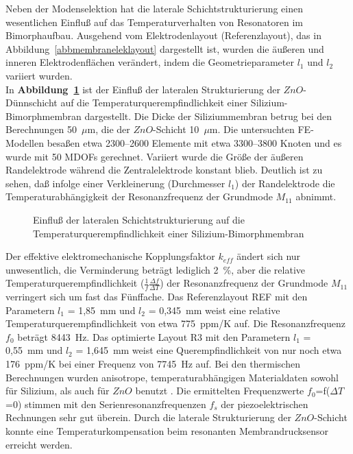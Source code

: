 Neben der Modenselektion hat die laterale Schichtstrukturierung einen
wesentlichen Einfluß auf das Temperaturverhalten von Resonatoren im
Bimorphaufbau. Ausgehend vom Elektrodenlayout (Referenzlayout), das in
Abbildung~\ref{abbmembraneleklayout} dargestellt ist, wurden die äußeren
und inneren Elektrodenflächen verändert, indem die Geometrieparameter
$l_{1}$ und $l_{2}$ variiert wurden. \\
%
%
In {\bf Abbildung~\ref{abbtempabhfreq}} ist der Einfluß der lateralen
Strukturierung der $ZnO$-Dünnschicht auf die Temperaturquerempfindlichkeit
einer Silizium-Bimorphmembran dargestellt. Die Dicke der Siliziummembran
betrug bei den Berechnungen 50~$\mu$m, die der $ZnO$-Schicht 10~$\mu$m.
Die untersuchten FE-Modellen besaßen etwa 2300--2600 Elemente mit etwa
3300--3800 Knoten und es wurde mit 50 MDOFs gerechnet.
Variiert wurde die Größe der äußeren Randelektrode während die
Zentralelektrode konstant blieb. Deutlich ist zu sehen, daß infolge
einer Verkleinerung (Durchmesser $l_{1}$) der Randelektrode die
Temperaturabhängigkeit der Resonanzfrequenz der Grundmode $M_{11}$ abnimmt.
\begin{figure}[htb]

\begin{center}

\setabbfelf
\end{center}
\caption{\label{abbtempabhfreq}
 Einfluß der lateralen Schichtstrukturierung auf die
 Temperaturquerempfindlichkeit einer Silizium-Bimorphmembran }
\end{figure}
Der effektive elektromechanische Kopplungsfaktor $k_{eff}$ ändert sich nur
unwesentlich, die Verminderung beträgt lediglich 2~\%, aber die relative
Temperaturquerempfindlichkeit ($\frac{1}{f}\frac{\Delta f}{\Delta T}$)
der Resonanzfrequenz der Grundmode $M_{11}$ verringert sich um fast das
Fünffache. Das Referenzlayout REF mit den Parametern $l_{1}$ = 1,85~mm
und $l_{2}$ = 0,345~mm weist eine relative Temperaturquerempfindlichkeit
von etwa 775~ppm/K auf. Die Resonanzfrequenz $f_{0}$ beträgt 8443~Hz.
Das optimierte Layout R3 mit den Parametern $l_{1}$ = 0,55~mm
und $l_{2}$ = 1,645~mm weist eine Querempfindlichkeit von nur noch etwa
176~ppm/K bei einer Frequenz von 7745~Hz auf.
Bei den thermischen Berechnungen wurden anisotrope, temperaturabhängigen
Materialdaten sowohl für Silizium, als auch für $ZnO$ benutzt \cite{LB82}.
Die ermittelten Frequenzwerte $f_{0}$=f($\Delta T$=0) stimmen mit den
Serienresonanzfrequenzen $f_{s}$ der piezoelektrischen Rechnungen sehr
gut überein. Durch die laterale Strukturierung der $ZnO$-Schicht konnte
eine Temperaturkompensation beim resonanten Membrandrucksensor
erreicht werden.\\

